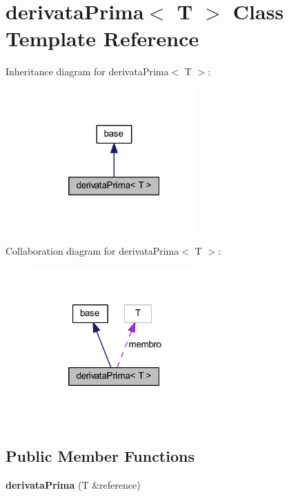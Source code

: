 \hypertarget{classderivata_prima}{
\section{derivataPrima$<$ T $>$ Class Template Reference}
\label{classderivata_prima}
}


Inheritance diagram for derivataPrima$<$ T $>$:\nopagebreak
\begin{figure}[H]
\begin{center}
\leavevmode
\includegraphics[width=176pt]{classderivata_prima__inherit__graph}
\end{center}
\end{figure}


Collaboration diagram for derivataPrima$<$ T $>$:\nopagebreak
\begin{figure}[H]
\begin{center}
\leavevmode
\includegraphics[width=180pt]{classderivata_prima__coll__graph}
\end{center}
\end{figure}
\subsection*{Public Member Functions}
\begin{DoxyCompactItemize}
\item 
\hypertarget{classderivata_prima_a8db37b674d6cc611be89f4632c777e4e}{
{\bfseries derivataPrima} (T \&reference)}
\label{classderivata_prima_a8db37b674d6cc611be89f4632c777e4e}

\end{DoxyCompactItemize}
